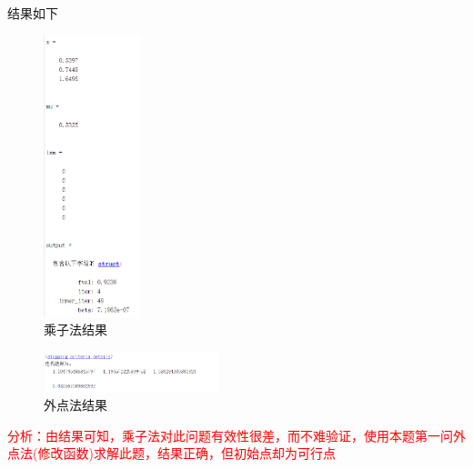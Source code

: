\documentclass[12pt]{article} %
\begin{document}
结果如下
\begin{figure}[ht]
	\centering
	\includegraphics[width=0.25\textwidth]{chengzi.png}
	\caption{乘子法结果}
	\label{fig:fig1}
\end{figure}
\begin{figure}[ht]
	\centering
	\includegraphics[width=0.45\textwidth]{waidian2.png}
	\caption{外点法结果}
	\label{fig:fig1}
\end{figure}

\textcolor{red}{分析：由结果可知，乘子法对此问题有效性很差，而不难验证，使用本题第一问外点法(修改函数)求解此题，结果正确，但初始点却为可行点}
\end{document}
